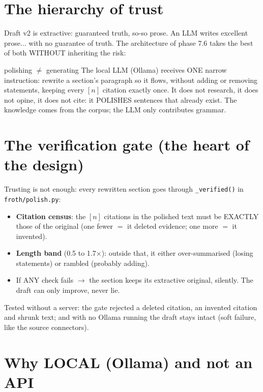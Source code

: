 \documentclass[11pt,a4paper]{article}
\begin{document}
\section{The hierarchy of trust}

Draft v2 is extractive: guaranteed truth, so-so prose. An LLM writes excellent prose... with no
guarantee of truth. The architecture of phase 7.6 takes the best of both WITHOUT inheriting the
risk:

\begin{concepto}{polishing $\neq$ generating}
The local LLM (Ollama) receives ONE narrow instruction: rewrite a section's paragraph so it
flows, without adding or removing statements, keeping every $[n]$ citation exactly once. It
does not research, it does not opine, it does not cite: it POLISHES sentences that already
exist. The knowledge comes from the corpus; the LLM only contributes grammar.
\end{concepto}

\section{The verification gate (the heart of the design)}

Trusting is not enough: every rewritten section goes through \texttt{\_verified()} in
\texttt{froth/polish.py}:

\begin{itemize}
  \item \textbf{Citation census}: the $[n]$ citations in the polished text must be EXACTLY
        those of the original (one fewer $=$ it deleted evidence; one more $=$ it invented).
  \item \textbf{Length band} (0.5 to 1.7$\times$): outside that, it either over-summarised
        (losing statements) or rambled (probably adding).
  \item If ANY check fails $\rightarrow$ the section keeps its extractive original, silently.
        The draft can only improve, never lie.
\end{itemize}

Tested without a server: the gate rejected a deleted citation, an invented citation and shrunk
text; and with no Ollama running the draft stays intact (soft failure, like the source
connectors).

\section{Why LOCAL (Ollama) and not an API}
\end{document}
